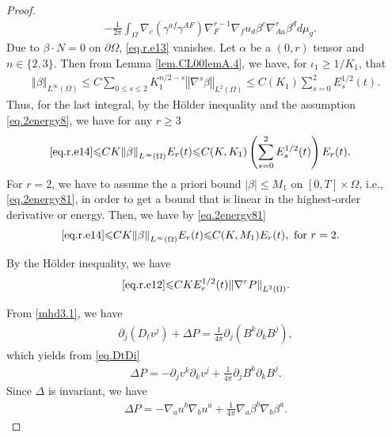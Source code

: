 \documentclass[12pt,reqno]{amsart}
\numberwithin{equation}{section}
\theoremstyle{definition}
\theoremstyle{remark}
\begin{document}
\begin{proof}
\begin{align}
  &-\frac{1}{2\pi}\int_{\Omega} {\nabla}_c\left(\gamma^{af}\gamma^{AF}\right){\nabla}_F^{r-1}{\nabla}_f u_d\beta^c{\nabla}_{Aa}^r\beta^d d\mu_g.\label{eq.r.e14}
\end{align}
Due to $\beta\cdot N=0$ on ${\partial}\Omega$,  \eqref{eq.r.e13} vanishes. Let $\alpha$ be a $(0,r)$ tensor and $n\in\{2,3\}$. Then from Lemma \ref{lem.CL00lemA.4}, we have, for $\iota_1{\geqslant} 1/K_1$, that
\begin{align}\label{eq.CllemmaA.4}
  {\left\Vert{\beta}\right\Vert}_{L^\infty(\Omega)}{\leqslant} C\sum_{0{\leqslant} s{\leqslant} 2} K_1^{n/2-s} {\left\Vert{{\nabla}^s \beta}\right\Vert}_{L^2(\Omega)}{\leqslant} C(K_1)\sum_{s=0}^2 E_s^{1/2}(t).
\end{align}
Thus, for the last integral, by the H\"older inequality and the assumption \eqref{eq.2energy8}, we have for any $r{\geqslant} 3$
\begin{align}
  \eqref{eq.r.e14}{\leqslant} &CK{\left\Vert{\beta}\right\Vert}_{L^\infty(\Omega)}E_r(t){\leqslant} C(K,K_1) \left(\sum_{s=0}^2 E_s^{1/2}(t)\right)E_r(t).
\end{align}
For $r=2$, we have to assume the a priori bound $|\beta|{\leqslant} M_1$ on $[0,T]\times \Omega$, i.e., \eqref{eq.2energy81}, in order to get a bound that is linear in the highest-order derivative or energy. Then, we have by \eqref{eq.2energy81}
\begin{align}
  \eqref{eq.r.e14}{\leqslant} &CK{\left\Vert{\beta}\right\Vert}_{L^\infty(\Omega)}E_r(t){\leqslant} C(K,M_1) E_r(t), \text{ for } r=2.
\end{align}

By the H\"older inequality, we have
\begin{align}\label{eq.up}
  \eqref{eq.r.e12}{\leqslant} CKE_r^{1/2}(t){\left\Vert{{\nabla}^r {P }}\right\Vert}_{L^2(\Omega)}.
\end{align}

From \eqref{mhd3.1}, we have
\begin{align*}
  {\partial}_j(D_t v^j)+\Delta{P } =\frac{1}{4\pi}{\partial}_j(B^k{\partial}_k B^j),
\end{align*}
which yields from \eqref{eq.DtDi}
\begin{align*}
  \Delta{P } =-{\partial}_j v^k{\partial}_k v^j+\frac{1}{4\pi}{\partial}_j B^k{\partial}_k B^j.
\end{align*}
Since $\Delta$ is invariant, we have
\begin{align}\label{eq.2e.p}
  \Delta {P }=-{\nabla}_a u^b{\nabla}_b u^a+\frac{1}{4\pi}{\nabla}_a \beta^b {\nabla}_b \beta^a.
\end{align}


\end{proof}
\end{document}
